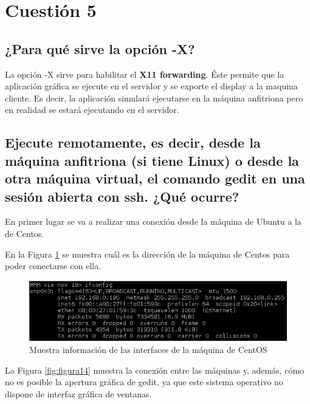 \cite{enlace1,enlace2}


\section{Cuestión 5}
\subsection{¿Para qué sirve la opción -X?}

La opción -X \cite{enlace16} sirve para habilitar el \textbf{X11 forwarding}. Éste permite que la aplicación gráfica se ejecute en el servidor y se exporte el display a la maquina cliente. Es decir, la aplicación simulará ejecutarse en la máquina anfitriona pero en realidad se estará ejecutando en el servidor.

\subsection{Ejecute remotamente, es
	decir, desde la máquina anfitriona (si tiene Linux) o desde la otra máquina
	virtual, el comando gedit en una sesión abierta con ssh. ¿Qué ocurre?}

En primer lugar se va a realizar una conexión desde la máquina de Ubuntu a la de Centos.

En la Figura \ref{fig:figura15} se muestra cuál es la dirección de la máquina de Centos para poder conectarse con ella.

\begin{figure}[H] %
	\centering
	\includegraphics[scale=0.8]{figuras/figura15.png} 
	\caption{Muestra información de las interfaces de la máquina de CentOS} 
	\label{fig:figura15}
\end{figure}

La Figura \ref{fig:figura14} muestra la conexión entre las máquinas y, además, cómo no es posible la apertura gráfica de gedit, ya que este sistema operativo no dispone de interfaz gráfica de ventanas.

